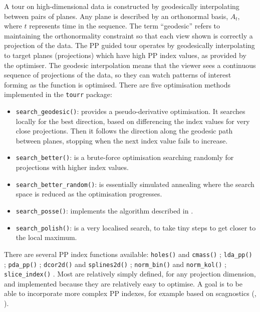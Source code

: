 \documentclass[
  number,
  preprint,
  3p]{elsarticle}
\providecommand{\tightlist}{%
  \setlength{\itemsep}{0pt}\setlength{\parskip}{0pt}}\usepackage{longtable,booktabs,array}
\begin{document}
A tour on high-dimensional data is constructed by geodesically
interpolating between pairs of planes. Any plane is described by an
orthonormal basis, \(A_t\), where \(t\) represents time in the sequence.
The term ``geodesic'' refers to maintaining the orthonormality
constraint so that each view shown is correctly a projection of the
data. The PP guided tour operates by geodesically interpolating to
target planes (projections) which have high PP index values, as provided
by the optimiser. The geodesic interpolation means that the viewer sees
a continuous sequence of projections of the data, so they can watch
patterns of interest forming as the function is optimised. There are
five optimisation methods implemented in the \texttt{tourr} package:

\begin{itemize}
\tightlist
\item
  \texttt{search\_geodesic()}: provides a pseudo-derivative
  optimisation. It searches locally for the best direction, based on
  differencing the index values for very close projections. Then it
  follows the direction along the geodesic path between planes, stopping
  when the next index value fails to increase.
\item
  \texttt{search\_better()}: is a brute-force optimisation searching
  randomly for projections with higher index values.
\item
  \texttt{search\_better\_random()}: is essentially simulated annealing
  \citep{Bertsimas93} where the search space is reduced as the
  optimisation progresses.
\item
  \texttt{search\_posse()}: implements the algorithm described in
  \citet{posse95}.
\item
  \texttt{search\_polish()}: is a very localised search, to take tiny
  steps to get closer to the local maximum.
\end{itemize}

There are several PP index functions available: \texttt{holes()} and
\texttt{cmass()} \citep{cook1993projection}; \texttt{lda\_pp()}
\citep{lee2005projection}; \texttt{pda\_pp()} \citep{lee2010projection};
\texttt{dcor2d()} and \texttt{splines2d()} \citep{Grimm2016};
\texttt{norm\_bin()} and \texttt{norm\_kol()} \citep{huber85};
\texttt{slice\_index()} \citep{Laa:2020wkm}. Most are relatively simply
defined, for any projection dimension, and implemented because they are
relatively easy to optimise. A goal is to be able to incorporate more
complex PP indexes, for example based on scagnostics (\citet{scag},
\citet{WW08}).
\end{document}
